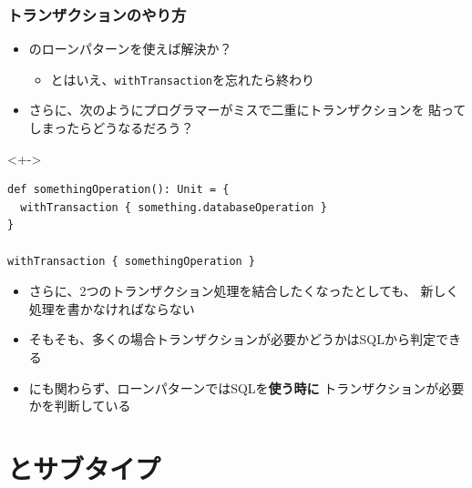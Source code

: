 \begin{frame}[fragile]
  \frametitle{トランザクションのやり方}

  \begin{itemize}
    \item<+-> のローンパターンを使えば解決か？
    \begin{itemize}
      \item<+-> とはいえ、\lstinline|withTransaction|を忘れたら終わり
    \end{itemize}
    
    \item<+-> さらに、次のようにプログラマーがミスで二重にトランザクションを
    貼ってしまったらどうなるだろう？    
  \end{itemize}

  \begin{uncoverenv}<+->
\begin{lstlisting}[style=scala]
def somethingOperation(): Unit = {
  withTransaction { something.databaseOperation }
}
    
withTransaction { somethingOperation }
\end{lstlisting}
  \end{uncoverenv}

  \begin{itemize}
    \item<+-> さらに、2つのトランザクション処理を結合したくなったとしても、
    新しく処理を書かなければならない
    
    \item<+-> そもそも、多くの場合トランザクションが必要かどうかはSQLから判定できる
    
    \item<+-> にも関わらず、ローンパターンではSQLを\textbf{使う時に}
    トランザクションが必要かを判断している
  \end{itemize}
\end{frame}

\section{\protect\Fujitask とサブタイプ}

